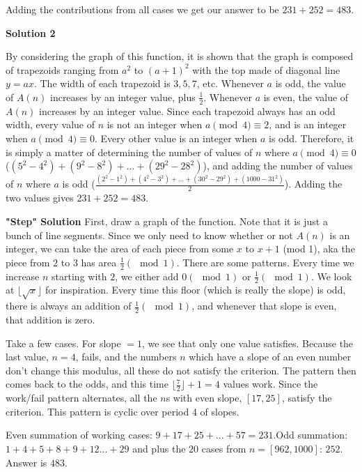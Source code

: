 \begin{enumerate}
 Adding the contributions from all cases we get our answer to be $231+252= \boxed{483}$.

 



\textbf{Solution 2}

By considering the graph of this function, it is shown that the graph is composed of trapezoids ranging from $a^2$ to $(a+1)^2$ with the top made of diagonal line $y=ax$. The width of each trapezoid is $3, 5, 7$, etc. Whenever $a$ is odd, the value of $A(n)$ increases by an integer value, plus $\frac{1}{2}$. Whenever $a$ is even, the value of $A(n)$ increases by an integer value. Since each trapezoid always has an odd width, every value of $n$ is not an integer when $a \pmod{4} \equiv 2$, and is an integer when $a \pmod{4} \equiv 0$. Every other value is an integer when $a$ is odd. Therefore, it is simply a matter of determining the number of values of $n$ where $a \pmod{4} \equiv 0$ ($(5^2-4^2)+(9^2-8^2)+...+(29^2-28^2)$), and adding the number of values of $n$ where $a$ is odd ($\frac{(2^2-1^2)+(4^2-3^2)+...+(30^2-29^2)+(1000-31^2)}{2}$). Adding the two values gives $231+252=\boxed{483}$.

 \textbf{"Step" Solution} First, draw a graph of the function. Note that it is just a bunch of line segments. Since we only need to know whether or not $A(n)$ is an integer, we can take the area of each piece from some $x$ to $x+1$ (mod 1), aka the piece from $2$ to $3$ has area $\frac{1}{2} (\mod 1)$. There are some patterns. Every time we increase $n$ starting with $2$, we either add $0 (\mod 1)$ or $\frac{1}{2} (\mod 1)$. We look at $\lfloor \sqrt{x} \rfloor$ for inspiration. Every time this floor (which is really the slope) is odd, there is always an addition of $\frac{1}{2} (\mod 1)$, and whenever that slope is even, that addition is zero.

 Take a few cases. For slope $=1$, we see that only one value satisfies. Because the last value, $n=4$, fails, and the numbers $n$ which have a slope of an even number don't change this modulus, all these do not satisfy the criterion. The pattern then comes back to the odds, and this time $\lfloor \frac{7}{2} \rfloor + 1 = 4$ values work. Since the work/fail pattern alternates, all the $n$s with even slope, $[17, 25]$, satisfy the criterion. This pattern is cyclic over period 4 of slopes.

 Even summation of working cases: $9+17+25+...+57 = 231$.Odd summation: $1+4+5+8+9+12...+29$ and plus the $20$ cases from $n=[962, 1000]$: $252$. Answer is $\boxed{483}$.


\end{enumerate}
